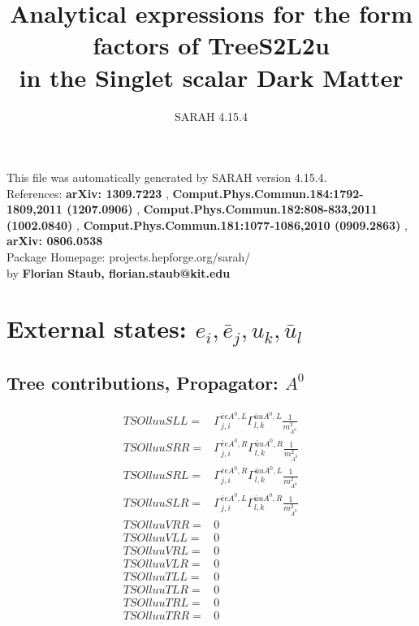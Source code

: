 \documentclass[A4,landscape]{article}
\begin{document}
\title{Analytical expressions for the form factors of TreeS2L2u\\ in the Singlet scalar Dark Matter } 
 \author{SARAH 4.15.4} 
 \maketitle 
 \vspace{10cm} 
This file was automatically generated by SARAH version 4.15.4.  \\ 
References: {\bf arXiv: 1309.7223 }, {\bf Comput.Phys.Commun.184:1792-1809,2011 (1207.0906) }, {\bf Comput.Phys.Commun.182:808-833,2011 (1002.0840) }, {\bf Comput.Phys.Commun.181:1077-1086,2010 (0909.2863) }, {\bf arXiv: 0806.0538 } \\ 
Package Homepage: projects.hepforge.org/sarah/ \\ 
by {\bf Florian Staub, florian.staub@kit.edu} 
 \pagebreak 
 \tableofcontents 
 \pagebreak 
\section{External states: ${e_{{i}}, \bar{e}_{{j}}, u_{{k}}, \bar{u}_{{l}}}$} 
\subsection{Tree contributions, Propagator: $A^0$} 

\begin{align} 
  TSOlluuSLL= & \Gamma^{\bar{e}e A^0 ,L}_{j, i} \Gamma^{\bar{u}u A^0 ,L}_{l, k} \frac{1}{m^2_{A^0}} \\ 
  TSOlluuSRR= & \Gamma^{\bar{e}e A^0 ,R}_{j, i} \Gamma^{\bar{u}u A^0 ,R}_{l, k} \frac{1}{m^2_{A^0}} \\ 
  TSOlluuSRL= & \Gamma^{\bar{e}e A^0 ,R}_{j, i} \Gamma^{\bar{u}u A^0 ,L}_{l, k} \frac{1}{m^2_{A^0}} \\ 
  TSOlluuSLR= & \Gamma^{\bar{e}e A^0 ,L}_{j, i} \Gamma^{\bar{u}u A^0 ,R}_{l, k} \frac{1}{m^2_{A^0}} \\ 
  TSOlluuVRR= & 0 \\ 
  TSOlluuVLL= & 0 \\ 
  TSOlluuVRL= & 0 \\ 
  TSOlluuVLR= & 0 \\ 
  TSOlluuTLL= & 0 \\ 
  TSOlluuTLR= & 0 \\ 
  TSOlluuTRL= & 0 \\ 
  TSOlluuTRR= & 0 \\ 
\end{align} 
\end{document}
